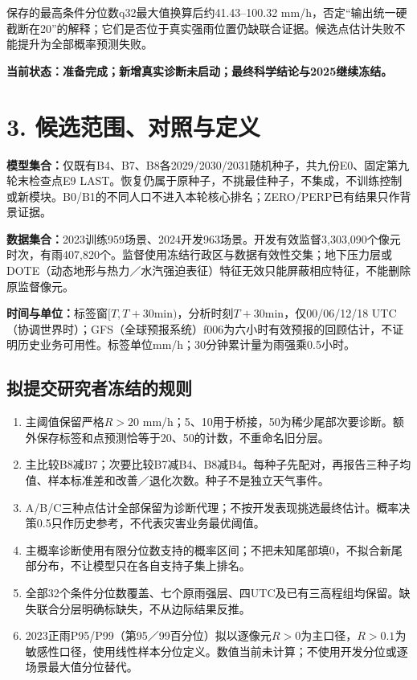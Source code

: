 \documentclass[UTF8,a4paper,10pt,fontset=none]{ctexart}
\newcommand{\key}[1]{\textcolor{ink}{\textbf{#1}}}
\begin{document}
保存的最高条件分位数q32最大值换算后约41.43--100.32 mm/h，否定“输出统一硬截断在20”的解释；它们是否位于真实强雨位置仍缺联合证据。候选点估计失败不能提升为全部概率预测失败。

\key{当前状态：准备完成；新增真实诊断未启动；最终科学结论与2025继续冻结。}

\newpage
\section*{3. 候选范围、对照与定义}
\textbf{模型集合：}仅既有B4、B7、B8各2029/2030/2031随机种子，共九份E0、固定第九轮末检查点E9 LAST。恢复仍属于原种子，不挑最佳种子，不集成，不训练控制或新模块。B0/B1的不同人口不进入本轮核心排名；ZERO/PERP已有结果只作背景证据。

\textbf{数据集合：}2023训练959场景、2024开发963场景。开发有效监督3,303,090个像元时次，有雨407,820个。监督使用冻结行政区与数据有效性交集；地下压力层或DOTE（动态地形与热力／水汽强迫表征）特征无效只能屏蔽相应特征，不能删除原监督像元。

\textbf{时间与单位：}标签窗$[T,T+30\mathrm{min})$，分析时刻$T+30\mathrm{min}$，仅00/06/12/18 UTC（协调世界时）；GFS（全球预报系统）f006为六小时有效预报的回顾估计，不证明历史业务可用性。标签单位mm/h；30分钟累计量为雨强乘0.5小时。

\subsection*{拟提交研究者冻结的规则}
\begin{enumerate}
\item 主阈值保留严格$R>20$ mm/h；5、10用于桥接，50为稀少尾部次要诊断。额外保存标签和点预测恰等于20、50的计数，不重命名旧分层。
\item 主比较B8减B7；次要比较B7减B4、B8减B4。每种子先配对，再报告三种子均值、样本标准差和改善／退化次数。种子不是独立天气事件。
\item A/B/C三种点估计全部保留为诊断代理；不按开发表现挑选最终估计。概率决策0.5只作历史参考，不代表灾害业务最优阈值。
\item 主概率诊断使用有限分位数支持的概率区间；不把未知尾部填0，不拟合新尾部分布，不让模型只在各自支持子集上排名。
\item 全部32个条件分位数覆盖、七个原雨强层、四UTC及已有三高程组均保留。缺失联合分层明确标缺失，不从边际结果反推。
\item 2023正雨P95/P99（第95／99百分位）拟以逐像元$R>0$为主口径，$R>0.1$为敏感性口径，使用线性样本分位定义。数值当前未计算；不使用开发分位或逐场景最大值分位替代。
\end{enumerate}
\end{document}

